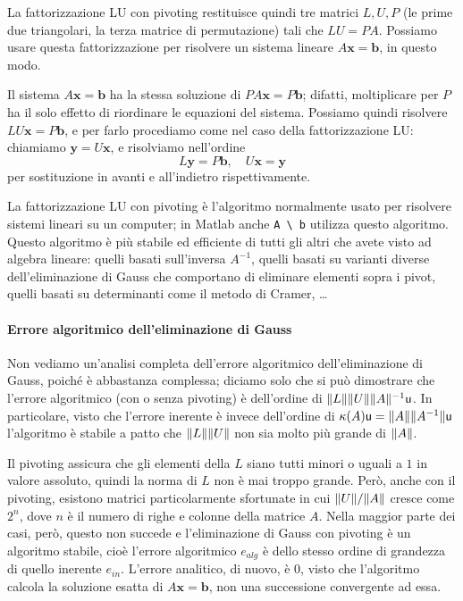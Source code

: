 \documentclass[a4paper]{report}
\DeclarePairedDelimiter{\norm}{\lVert}{\rVert}
\theoremstyle{definiton}
\theoremstyle{remark}
\newcommand{\x}{\mathbf{x}}
\renewcommand{\b}{\mathbf{b}}
\begin{document}
La fattorizzazione LU con pivoting restituisce quindi tre matrici $L,U,P$ (le prime due triangolari, la terza matrice di permutazione) tali che $LU = PA$. Possiamo usare questa fattorizzazione per risolvere un sistema lineare $A\x=\b$, in questo modo.

Il sistema $A\x = \b$ ha la stessa soluzione di $PA\x = P\b$; difatti, moltiplicare per $P$ ha il solo effetto di riordinare le equazioni del sistema. Possiamo quindi risolvere $LU\x=P\b$, e per farlo procediamo come nel caso della fattorizzazione LU: chiamiamo $\mathbf{y}=U\x$, e risolviamo nell'ordine
\[
L\mathbf{y} = P\b, \quad U\x = \mathbf{y}
\]
per sostituzione in avanti e all'indietro rispettivamente.

La fattorizzazione LU con pivoting è l'algoritmo normalmente usato per risolvere sistemi lineari su un computer; in Matlab 
anche \lstinline{A \ b} utilizza questo algoritmo. Questo algoritmo è più stabile ed efficiente di tutti gli altri che avete visto ad algebra lineare: quelli basati sull'inversa $A^{-1}$, quelli basati su varianti diverse dell'eliminazione di Gauss che comportano di eliminare elementi sopra i pivot, quelli basati su determinanti come il metodo di Cramer, \dots

\paragraph{Errore algoritmico dell'eliminazione di Gauss}
Non vediamo un'analisi completa dell'errore algoritmico dell'eliminazione di Gauss, poiché è abbastanza complessa; diciamo solo che si può dimostrare che l'errore algoritmico (con o senza pivoting) è dell'ordine di $\norm{L}\norm{U} \norm{A}^{-1} \mathsf{u}$. In particolare, visto che l'errore inerente è invece dell'ordine di $\kappa(A)\mathsf{u} = \norm{A}\norm{A^{-1}}\mathsf{u}$  l'algoritmo è stabile a patto che $\norm{L}\norm{U}$ non sia molto più grande di $\norm{A}$.

Il pivoting assicura che gli elementi della $L$ siano tutti minori o uguali a $1$ in valore assoluto, quindi la norma di $L$ non è mai troppo grande. Però, anche con il pivoting, esistono matrici particolarmente sfortunate in cui $\norm{U}/\norm{A}$ cresce come $2^n$, dove $n$ è il numero di righe e colonne della matrice $A$. Nella maggior parte dei casi, però, questo non succede e l'eliminazione di Gauss con pivoting è un algoritmo stabile, cioè l'errore algoritmico $e_{alg}$ è dello stesso ordine di grandezza di quello inerente $e_{in}$. L'errore analitico, di nuovo, è $0$, visto che l'algoritmo calcola la soluzione esatta di $A\x=\b$, non una successione convergente ad essa.
\end{document}
